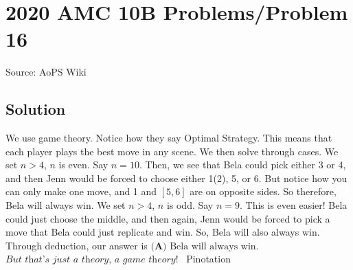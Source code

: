 \documentclass[12pt]{article}
\begin{document}
\section*{{2020 AMC 10B Problems/Problem 16}}
Source: AoPS Wiki

\subsection*{Solution}
We use game theory. Notice how they say Optimal Strategy. This means that each player plays the best move in any scene. We then solve through cases. We set \( n > 4 \), \( n \) is even. Say \( n = 10 \). Then, we see that Bela could pick either 3 or 4, and then Jenn would be forced to choose either 1(2), 5, or 6. But notice how you can only make one move, and 1 and \( [5,6] \) are on opposite sides. So therefore, Bela will always win. We set \( n > 4 \), \( n \) is odd. Say \( n = 9 \). This is even easier! Bela could just choose the middle, and then again, Jenn would be forced to pick a move that Bela could just replicate and win. So, Bela will also always win. Through deduction, our answer is $\boxed{\textbf{(A)} \text{ Bela will always win.}}$ $\textit{But that's just a theory, a game theory!}$ ~Pinotation
\end{document}
